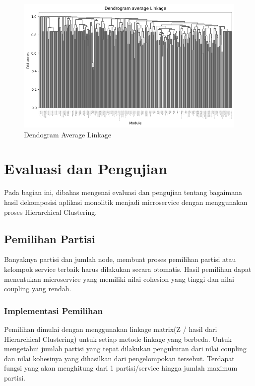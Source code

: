 \begin{figure}[htbp]
	\centering
	\begin{minipage}{1\textwidth}
		\centering
		\includegraphics[width=1\textwidth]{img/bab_4/avg_dd.png}
		\caption{Dendogram Average Linkage }
		\label{fig:dd_avg}
	\end{minipage}\hfill	
\end{figure}

\pagebreak


\section{Evaluasi dan Pengujian}
Pada bagian ini, dibahas mengenai evaluasi dan pengujian tentang bagaimana hasil dekomposisi aplikasi monolitik menjadi microservice dengan menggunakan proses Hierarchical Clustering.

\subsection{Pemilihan Partisi}
Banyaknya partisi dan jumlah node, membuat proses pemilihan partisi atau kelompok service terbaik harus dilakukan secara otomatis. Hasil pemilihan dapat menentukan microservice yang memiliki nilai cohesion yang tinggi dan nilai coupling yang rendah.

\subsubsection{Implementasi Pemilihan}
  Pemilihan dimulai dengan menggunakan linkage matrix(Z / hasil dari Hierarchical Clustering) untuk setiap metode linkage yang berbeda. Untuk mengetahui jumlah partisi yang tepat dilakukan pengukuran dari nilai coupling dan nilai kohesinya yang dihasilkan dari pengelompokan tersebut. Terdapat fungsi yang akan menghitung dari 1 partisi/service hingga jumlah maximum partisi.

